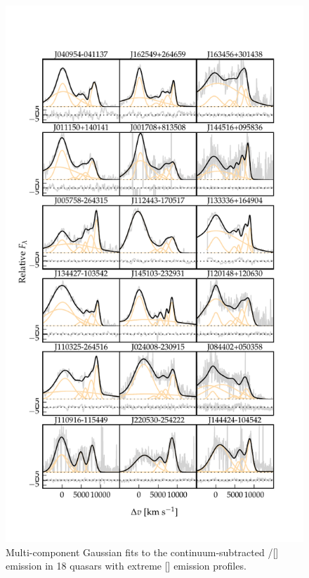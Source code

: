 \begin{figure}
    \centering
    \includegraphics[width=1\columnwidth]{figures/chapter04/example_spectrum_grid_extreme_oiii.pdf} 
    \caption{Multi-component Gaussian fits to the continuum-subtracted \hbns/[] emission in 18 quasars with extreme [] emission profiles.}     
    \label{fig:example_spectrum_grid_extreme_oiii}
\end{figure}

